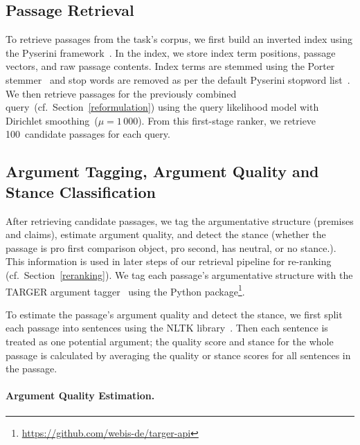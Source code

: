\subsection{Passage Retrieval}\label{retrieval}

To retrieve passages from the task's corpus, we first build an inverted index using the Pyserini framework~\cite{LinMLYPN2021}.
In the index, we store index term positions, passage vectors, and raw passage contents.
Index terms are stemmed using the Porter stemmer~\cite{Porter1980} and stop words are removed as per the default Pyserini stopword list~\cite{LinMLYPN2021}.
We then retrieve passages for the previously combined query~(cf.\ Section~\ref{reformulation}) using the query likelihood model with Dirichlet smoothing~(\( \mu = 1\,000 \)).
From this first-stage ranker, we retrieve 100~candidate passages for each query.

\subsection{Argument Tagging, Argument Quality and Stance Classification}
\label{argument-tagging}

After retrieving candidate passages, we tag the argumentative structure (premises and claims), estimate argument quality, and detect the stance (whether the passage is pro first comparison object, pro second, has neutral, or no stance.).
This information is used in later steps of our retrieval pipeline for re-ranking (cf.\ Section~\ref{reranking}).
We tag each passage's argumentative structure with the TARGER argument tagger~\cite{ChernodubOHBHBP2019} using the  Python package\footnote{\url{https://github.com/webis-de/targer-api}}.

To estimate the passage's argument quality and detect the stance, we first split each passage into sentences using the NLTK library~\cite{BirdLK2009}.
Then each sentence is treated as one potential argument; the quality score and stance for the whole passage is calculated by averaging the quality or stance scores for all sentences in the passage.

\paragraph{Argument Quality Estimation.}


